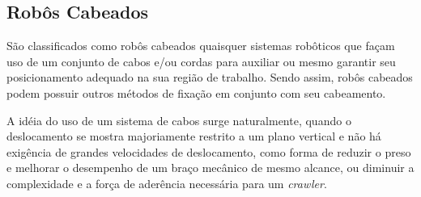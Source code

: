 \subsection{Robôs Cabeados}

São classificados como robôs cabeados quaisquer sistemas robôticos que façam
uso de um conjunto de cabos e/ou cordas para auxiliar ou mesmo garantir seu
posicionamento adequado na sua região de trabalho. Sendo assim, robôs cabeados
podem possuir outros métodos de fixação em conjunto com seu cabeamento.

A idéia do uso de um sistema de cabos surge naturalmente, quando o deslocamento
se mostra majoriamente restrito a um plano vertical e não há exigência de
grandes velocidades de deslocamento, como forma de reduzir o preso e melhorar o
desempenho de um braço mecânico de mesmo alcance, ou diminuir a complexidade e
a força de aderência necessária para um \textit{crawler}.


